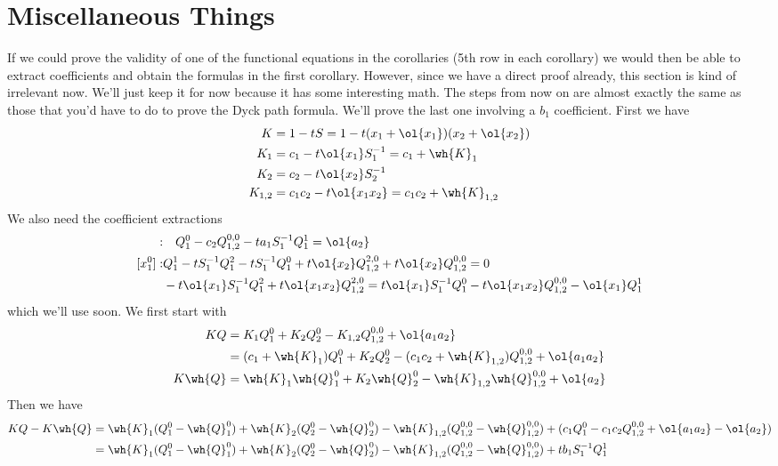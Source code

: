 
\chapter{Miscellaneous Things}

If we could prove the validity of one of the functional equations in the corollaries (5th row in each corollary) we would then be able to extract coefficients and obtain the formulas in the first corollary. However, since we have a direct proof already, this section is kind of irrelevant now. We'll just keep it for now because it has some interesting math. The steps from now on are almost exactly the same as those that you'd have to do to prove the Dyck path formula. We'll prove the last one involving a $b_1$ coefficient. First we have
\begin{align}
   K &= 1 - tS = 1 - t(x_1+\ol{x_1})(x_2+\ol{x_2})\\
   K_1 &= c_1 - t \ol{x_1} S_1^{-1} = c_1 + \wh{K}_1\\
   K_2 &= c_2 - t \ol{x_2} S_2^{-1}\\
   K_{1,2} &= c_1c_2 - t\ol{x_1x_2} = c_1c_2+\wh{K}_{1,2}
\end{align}
We also need the coefficient extractions
\begin{align}[x_1^0]:&\quad Q_1^0 - c_2Q_{1,2}^{0,0}-ta_1S_1^{-1}Q_1^1 =\ol{a_2}\\
[x_1^0]: &Q_1^1-tS_1^{-1}Q_1^2-tS_1^{-1}Q_1^0+ t \ol{x_2}Q_{1,2}^{2,0}+t\ol{x_2}Q_{1,2}^{0,0} = 0\\
                &-t\ol{x_1}S_1^{-1}Q_1^2+t\ol{x_1x_2}Q_{1,2}^{2,0} = t\ol{x_1}S_1^{-1}Q_1^0-t\ol{x_1x_2}Q_{1,2}^{0,0}-\ol{x_1}Q_1^1
\end{align}
which we'll use soon. We first start with
\begin{align}
KQ &= K_1Q_1^0 + K_2 Q_2^0-K_{1,2}Q_{1,2}^{0,0} + \ol{a_1a_2}\\ 
      &= (c_1+\wh{K}_1)Q_1^0 + K_2 Q_2^0-(c_1c_2+\wh{K}_{1,2})Q_{1,2}^{0,0} + \ol{a_1a_2}\\
K\wh{Q} &=\wh{K}_1\wh{Q}_1^0 + K_2 \wh{Q}_2^0-\wh{K}_{1,2}\wh{Q}_{1,2}^{0,0} + \ol{a_2}
\end{align}
Then we have
\begin{align}
KQ-K\wh{Q} &= \wh{K}_1(Q_1^0-\wh{Q}_1^0)+\wh{K}_2(Q_2^0-\wh{Q}_2^0)-\wh{K}_{1,2}(Q_{1,2}^{0,0}-\wh{Q}_{1,2}^{0,0})+(c_1Q_1^0-c_1c_2Q_{1,2}^{0,0}+\ol{a_1a_2}-\ol{a_2})\\
                     &=\wh{K}_1(Q_1^0-\wh{Q}_1^0)+\wh{K}_2(Q_2^0-\wh{Q}_2^0)-\wh{K}_{1,2}(Q_{1,2}^{0,0}-\wh{Q}_{1,2}^{0,0}) + tb_1S_1^{-1}Q_1^1
\end{align}
